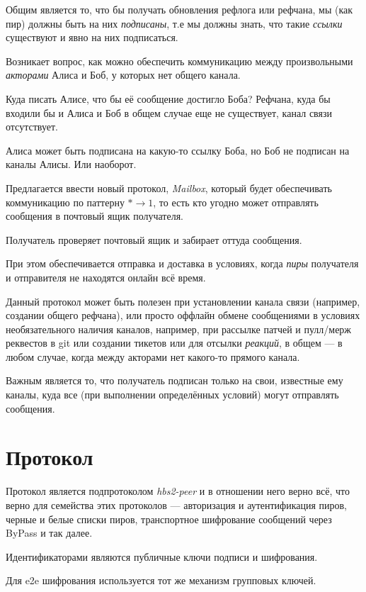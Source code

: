 \documentclass[11pt,a4paper]{article}
\newcommand{\term}[2]{\textit{#2}}
\begin{document}
Общим является то, что бы получать обновления рефлога или рефчана, мы (как пир)
должны быть на них \term{subscribed}{подписаны}, т.е мы должны знать, что такие
\term{ref}{ссылки} существуют и явно на них подписаться.


Возникает вопрос, как можно обеспечить коммуникацию между произвольными
\term{actor}{акторами} Алиса и Боб, у которых нет общего канала.

Куда писать Алисе, что бы её сообщение достигло Боба? Рефчана, куда бы входили
бы и Алиса и Боб в общем случае еще не существует, канал связи отсутствует.

Алиса может быть подписана на какую-то ссылку Боба, но Боб не подписан на каналы
Алисы. Или наоборот.

Предлагается ввести новый протокол, \term{mailbox}{Mailbox}, который будет
обеспечивать коммуникацию по паттерну $ * \rightarrow 1 $, то есть кто угодно
может отправлять сообщения в почтовый ящик получателя.

Получатель проверяет почтовый ящик и забирает оттуда сообщения.

При этом обеспечивается отправка и доставка в условиях, когда \term{peer}{пиры}
получателя и отправителя  не находятся онлайн всё время.

Данный протокол может быть полезен при установлении канала связи (например,
создании общего рефчана), или просто оффлайн обмене сообщениями в условиях
необязательного наличия каналов, например, при рассылке патчей и пулл/мерж
реквестов в git или создании тикетов или для отсылки \textit{реакций}, в общем
---  в любом случае, когда между акторами нет какого-то прямого канала.

Важным является то, что получатель подписан только на свои, известные ему
каналы, куда все (при выполнении определённых условий) могут отправлять
сообщения.


\section{Протокол}

Протокол является подпротоколом \textit{hbs2-peer} и в отношении него верно всё,
что верно для семейства этих протоколов --- авторизация и аутентификация пиров,
черные и белые списки пиров, транспортное шифрование сообщений через ByPass и
так далее.

Идентификаторами являются публичные ключи подписи и шифрования.

Для e2e шифрования используется тот же механизм групповых ключей.
\end{document}

